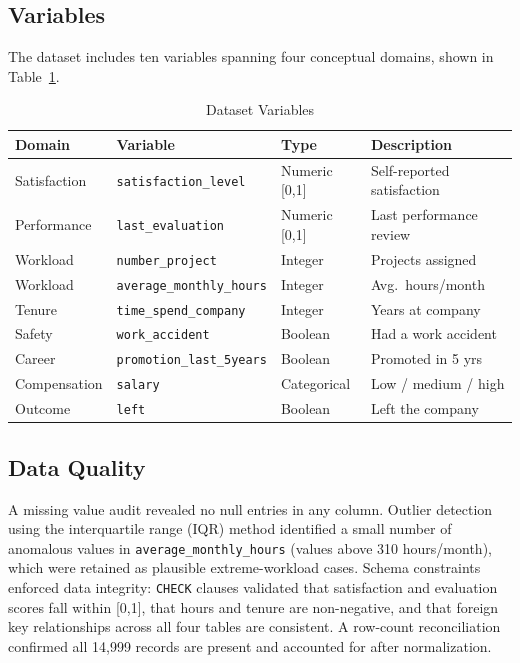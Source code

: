 \documentclass[conference]{IEEEtran}
\begin{document}
\subsection{Variables}

The dataset includes ten variables spanning four conceptual domains, shown
in Table~\ref{tab:variables}.

\begin{table}[h]
\caption{Dataset Variables}
\label{tab:variables}
\centering
\begin{tabular}{llll}
\toprule
\textbf{Domain} & \textbf{Variable} & \textbf{Type} & \textbf{Description} \\
\midrule
Satisfaction  & \texttt{satisfaction\_level}   & Numeric [0,1] & Self-reported satisfaction \\
Performance   & \texttt{last\_evaluation}       & Numeric [0,1] & Last performance review \\
Workload      & \texttt{number\_project}        & Integer       & Projects assigned \\
Workload      & \texttt{average\_monthly\_hours}& Integer       & Avg.\ hours/month \\
Tenure        & \texttt{time\_spend\_company}   & Integer       & Years at company \\
Safety        & \texttt{work\_accident}         & Boolean       & Had a work accident \\
Career        & \texttt{promotion\_last\_5years}& Boolean       & Promoted in 5 yrs \\
Compensation  & \texttt{salary}                 & Categorical   & Low / medium / high \\
Outcome       & \texttt{left}                   & Boolean       & Left the company \\
\bottomrule
\end{tabular}
\end{table}

\subsection{Data Quality}

A missing value audit revealed no null entries in any column. Outlier
detection using the interquartile range (IQR) method identified a small number
of anomalous values in \texttt{average\_monthly\_hours} (values above 310
hours/month), which were retained as plausible extreme-workload cases. Schema
constraints enforced data integrity: \texttt{CHECK} clauses validated that
satisfaction and evaluation scores fall within [0,1], that hours and tenure
are non-negative, and that foreign key relationships across all four tables
are consistent. A row-count reconciliation confirmed all 14,999 records are
present and accounted for after normalization.
\end{document}
